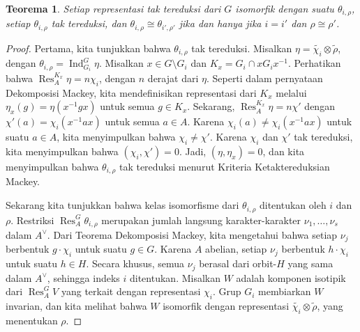 \documentclass[12pt]{article}
\theoremstyle{plain}
\newtheorem{theorem}{Teorema}[section]
\theoremstyle{definition}
\theoremstyle{remark}
\numberwithin{equation}{section}
\begin{document}
\begin{theorem}
Setiap representasi tak tereduksi dari $G$ isomorfik dengan suatu
$\theta_{i,\rho}$,
setiap $\theta_{i,\rho}$ tak tereduksi, dan
$\theta_{i,\rho} \cong \theta_{i', \rho'}$ jika dan hanya jika
$i=i'$ dan $\rho \cong \rho'$.
\end{theorem}

\begin{proof}
Pertama, kita tunjukkan bahwa $\theta_{i,\rho}$ tak tereduksi.
Misalkan $\eta = \widetilde{\chi_i} \otimes \widetilde{\rho}$,
dengan $\theta_{i,\rho} = \operatorname{Ind}_{G_i}^G \eta$.
Misalkan $x \in G \setminus G_i$ dan $K_x = G_i \cap xG_ix^{-1}$.
Perhatikan bahwa $\operatorname{Res}^{K_x}_A \eta = n\chi_i$,
dengan $n$ derajat dari $\eta$.
Seperti dalam pernyataan Dekomposisi Mackey,
kita mendefinisikan representasi dari $K_x$ melalui
$\eta_x (g) = \eta(x^{-1}gx)$ untuk semua $g \in K_x$.
Sekarang, $\operatorname{Res}^{K_x}_A \eta = n\chi'$
dengan $\chi'(a) = \chi_i(x^{-1}ax)$ untuk semua $a \in A$.
Karena $\chi_i(a) \ne \chi_i(x^{-1}ax)$ untuk suatu $a \in A$,
kita menyimpulkan bahwa $\chi_i \ne \chi'$.
Karena $\chi_i$ dan $\chi'$ tak tereduksi, kita menyimpulkan bahwa
$(\chi_i, \chi')=0$. Jadi, $(\eta,\eta_x)=0$, dan kita
menyimpulkan bahwa $\theta_{i,\rho}$ tak tereduksi menurut Kriteria
Ketaktereduksian Mackey.

Sekarang kita tunjukkan bahwa kelas isomorfisme dari $\theta_{i,\rho}$
ditentukan oleh $i$ dan $\rho$.
Restriksi $\operatorname{Res}^G_A \theta_{i,\rho}$
merupakan jumlah langsung karakter-karakter $\nu_1,\ldots,\nu_s$ dalam $A^\vee$.
Dari Teorema Dekomposisi Mackey, kita mengetahui bahwa setiap
$\nu_j$ berbentuk $g \cdot \chi_i$ untuk suatu $g \in G$.
Karena $A$ abelian, setiap $\nu_j$ berbentuk $h \cdot \chi_i$
untuk suatu $h \in H$. Secara khusus, semua $\nu_j$ berasal dari orbit-$H$
yang sama dalam $A^\vee$, sehingga indeks $i$ ditentukan.
Misalkan $W$ adalah komponen isotipik dari $\operatorname{Res}^G_A V$
yang terkait dengan representasi $\chi_i$.
Grup $G_i$ membiarkan $W$ invarian, dan kita melihat bahwa
$W$ isomorfik dengan representasi
$\widetilde{\chi_i} \otimes \widetilde{\rho}$,
yang menentukan $\rho$.


\end{proof}
\end{document}
